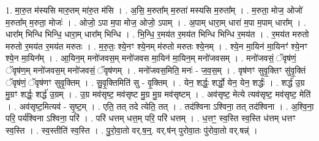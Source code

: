 \documentclass[17pt]{extarticle}
\begin{document}
1. मा॒रु॒त म॑स्यसि मारु॒तम् मा॑रु॒त म॑सि । . अ॒सि॒ म॒रुता᳚म् म॒रुता॑ मस्यसि म॒रुता᳚म् । . म॒रुता॒ मोज॒ ओजो॑ म॒रुता᳚म् म॒रुता॒ मोजः॑ । . ओजो॒ ऽपा म॒पा मोज॒ ओजो॒ ऽपाम् । . अ॒पाम् धारा॒म् धारा॑ म॒पा म॒पाम् धारा᳚म् । . धारा᳚म् भिन्धि भिन्धि॒ धारा॒म् धारा᳚म् भिन्धि । . भि॒न्धि॒ र॒मय॑त र॒मय॑त भिन्धि भिन्धि र॒मय॑त । . र॒मय॑त मरुतो मरुतो र॒मय॑त र॒मय॑त मरुतः । . म॒रु॒तः॒ श्ये॒नꣳ श्ये॒नम् म॑रुतो मरुतः श्ये॒नम् । . श्ये॒न मा॒यिन॑ मा॒यिनꣳ॑ श्ये॒नꣳ श्ये॒न मा॒यिन᳚म् । . आ॒यिन॒म् मनो॑जवस॒म् मनो॑जवस मा॒यिन॑ मा॒यिन॒म् मनो॑जवसम् । . मनो॑जवसं॒ ॅवृष॑णं॒ ॅवृष॑ण॒म् मनो॑जवस॒म् मनो॑जवसं॒ ॅवृष॑णम् । . मनो॑जवस॒मिति॒ मनः॑ - ज॒व॒स॒म् । . वृष॑णꣳ सुवृ॒क्तिꣳ सु॑वृ॒क्तिं ॅवृष॑णं॒ ॅवृष॑णꣳ सुवृ॒क्तिम् । . सु॒वृ॒क्तिमिति॑ सु - वृ॒क्तिम् । . येन॒ शर्द्धः॒ शर्द्धो॒ येन॒ येन॒ शर्द्धः॑ । . शर्द्ध॑ उ॒ग्र मु॒ग्रꣳ शर्द्धः॒ शर्द्ध॑ उ॒ग्रम् । . उ॒ग्र मव॑सृष्ट॒ मव॑सृष्ट मु॒ग्र मु॒ग्र मव॑सृष्टम् । . अव॑सृष्ट॒ मेत्ये त्यव॑सृष्ट॒ मव॑सृष्ट॒ मेति॑ । . अव॑सृष्ट॒मित्यव॑ - सृ॒ष्ट॒म् । . एति॒ तत् तदे त्येति॒ तत् । . तद॑श्विना ऽश्विना॒ तत् तद॑श्विना । . अ॒श्वि॒ना॒ परि॒ पर्य॑श्विना ऽश्विना॒ परि॑ । . परि॑ धत्तम् धत्त॒म् परि॒ परि॑ धत्तम् । . ध॒त्तꣳ॒॒ स्व॒स्ति स्व॒स्ति ध॑त्तम् धत्तꣳ स्व॒स्ति । . स्व॒स्तीति॑ स्व॒स्ति । . पु॒रो॒वा॒तो वर्.ष॒न्॒. वर्.ष॑न् पुरोवा॒तः पु॑रोवा॒तो वर्.षन्न्॑ । \newline
\end{document}
